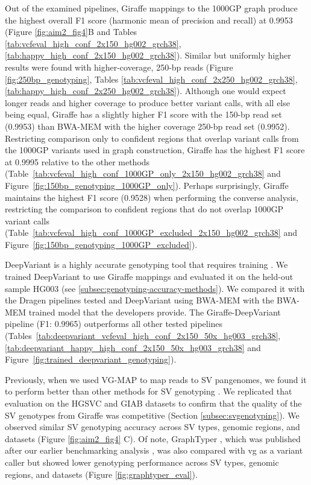 \documentclass[11pt]{ucscthesis}
\begin{document}
Out of the examined pipelines, Giraffe mappings to the 1000GP graph produce the highest overall F1 score (harmonic mean of precision and recall) at 0.9953 (Figure \ref{fig:aim2_fig4}B and Tables \ref{tab:vcfeval_high_conf_2x150_hg002_grch38}, \ref{tab:happy_high_conf_2x150_hg002_grch38}).
Similar but uniformly higher results were found with higher-coverage, 250-bp reads (Figure \ref{fig:250bp_genotyping}, Tables \ref{tab:vcfeval_high_conf_2x250_hg002_grch38}, \ref{tab:happy_high_conf_2x250_hg002_grch38}).
Although one would expect longer reads and higher coverage to produce better variant calls, with all else being equal, Giraffe has a slightly higher F1 score with the 150-bp read set (0.9953) than BWA-MEM with the higher coverage 250-bp read set (0.9952).
Restricting comparison only to confident regions that overlap variant calls from the 1000GP variants used in graph construction, Giraffe has the highest F1 score at 0.9995 relative to the other methods (Table~\ref*{tab:vcfeval_high_conf_1000GP_only_2x150_hg002_grch38} and Figure~\ref*{fig:150bp_genotyping_1000GP_only}).
Perhaps surprisingly, Giraffe maintains the highest F1 score (0.9528) when performing the converse analysis, restricting the comparison to confident regions that do not overlap 1000GP variant calls (Table~\ref*{tab:vcfeval_high_conf_1000GP_excluded_2x150_hg002_grch38} and Figure~\ref*{fig:150bp_genotyping_1000GP_excluded}).

DeepVariant is a highly accurate genotyping tool that requires training \cite{poplin_universal_2018}.
We trained DeepVariant to use Giraffe mappings and evaluated it on the held-out sample HG003 (see \ref{subsec:genotyping-accuracy-methods}).
We compared it with the Dragen pipelines tested and DeepVariant using BWA-MEM with the BWA-MEM trained model that the developers provide.
The Giraffe-DeepVariant pipeline (F1: 0.9965) outperforms all other tested pipelines (Tables~\ref*{tab:deepvariant_vcfeval_high_conf_2x150_50x_hg003_grch38}, \ref*{tab:deepvariant_happy_high_conf_2x150_50x_hg003_grch38} and Figure~\ref*{fig:trained_deepvariant_genotyping}).

Previously, when we used VG-MAP to map reads to SV pangenomes, we found it to perform better than other methods for SV genotyping \cite{hickey_vgsv_2020}.
We replicated that evaluation on the HGSVC and GIAB datasets \cite{zook_robust_2020,chaisson_sv_2019} to confirm that the quality of the SV genotypes from Giraffe was competitive (Section \ref{subsec:svgenotyping}).
We observed similar SV genotyping accuracy across SV types, genomic regions, and datasets (Figure \ref{fig:aim2_fig4} C). Of note, GraphTyper \cite{eggertsson2019}, which was published after our earlier benchmarking analysis \cite{hickey_vgsv_2020}, was also compared with vg as a variant caller but showed lower genotyping performance across SV types, genomic regions, and datasets  (Figure \ref{fig:graphtyper_eval}).
\end{document}
